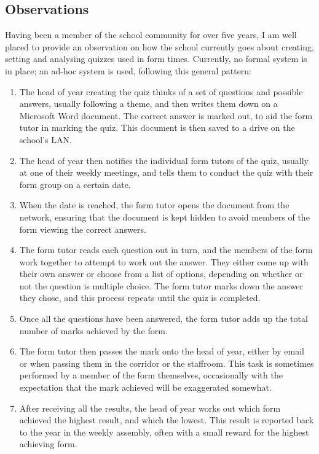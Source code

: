 \subsection{Observations}

Having been a member of the school community for over five years, I am well placed to provide an observation on how the school currently goes about creating, setting and analysing quizzes used in form times. Currently, no formal system is in place; an ad-hoc system is used, following this general pattern:

\begin{enumerate}
	\item The head of year creating the quiz thinks of a set of questions and possible answers, usually following a theme, and then writes them down on a Microsoft Word document. The correct answer is marked out, to aid the form tutor in marking the quiz. This document is then saved to a drive on the school's LAN.

	\item The head of year then notifies the individual form tutors of the quiz, usually at one of their weekly meetings, and tells them to conduct the quiz with their form group on a certain date.

	\item When the date is reached, the form tutor opens the document from the network, ensuring that the document is kept hidden to avoid members of the form viewing the correct answers.

	\item The form tutor reads each question out in turn, and the members of the form work together to attempt to work out the answer. They either come up with their own answer or choose from a list of options, depending on whether or not the question is multiple choice. The form tutor marks down the answer they chose, and this process repeats until the quiz is completed.

	\item Once all the questions have been answered, the form tutor adds up the total number of marks achieved by the form.

	\item The form tutor then passes the mark onto the head of year, either by email or when passing them in the corridor or the staffroom. This task is sometimes performed by a member of the form themselves, occasionally with the expectation that the mark achieved will be exaggerated somewhat.

	\item After receiving all the results, the head of year works out which form achieved the highest result, and which the lowest. This result is reported back to the year in the weekly assembly, often with a small reward for the highest achieving form.
\end{enumerate}
